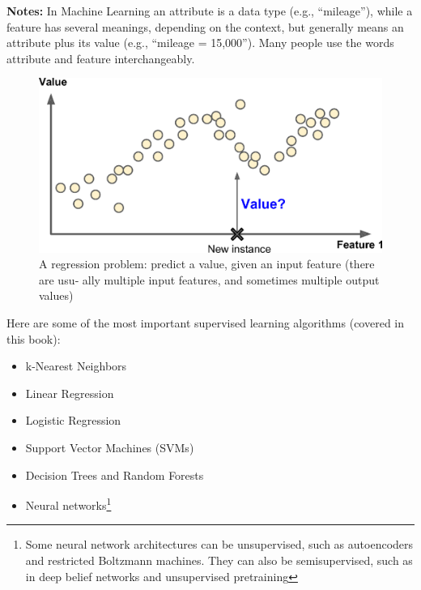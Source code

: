 \textbf{Notes:} In Machine Learning an attribute is a data type (e.g., “mileage”),
while a feature has several meanings, depending on the context, but
generally means an attribute plus its value (e.g., “mileage =
15,000”). Many people use the words attribute and feature interchangeably.

\begin{figure}
\centering
\includegraphics{img/A regression problem predict a value, given an input feature.png}
\caption{A regression problem: predict a value, given an input feature (there are usu‐
ally multiple input features, and sometimes multiple output values)}
\label{A regression problem predict a value, given an input feature}
\end{figure}

Here are some of the most important supervised learning algorithms (covered in this
book):
\begin{itemize}
\item
k-Nearest Neighbors
\item Linear Regression
\item Logistic Regression
\item Support Vector Machines (SVMs)
\item Decision Trees and Random Forests
\item Neural networks\footnote{Some neural network architectures can be unsupervised, such as autoencoders and restricted Boltzmann
machines. They can also be semisupervised, such as in deep belief networks and unsupervised pretraining}
\end{itemize}
